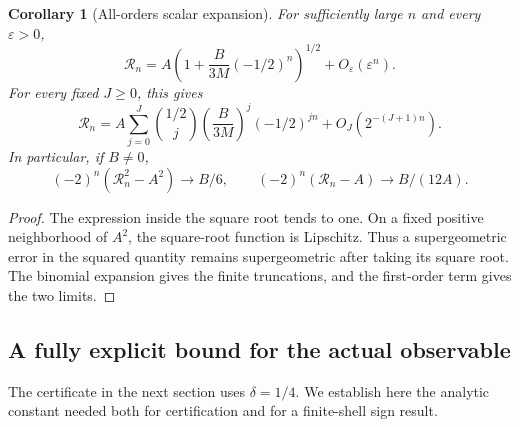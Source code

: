 \documentclass[11pt,a4paper]{article}
\newtheorem{corollary}[theorem]{Corollary}
\theoremstyle{definition}
\theoremstyle{remark}
\numberwithin{equation}{section}
\begin{document}
\begin{corollary}[All-orders scalar expansion]
\label{cor:allorders}
For sufficiently large $n$ and every $\varepsilon>0$,
\begin{equation}
 \mathcal R_n=
 A\left(1+\frac{B}{3M}(-1/2)^n\right)^{1/2}
 +O_\varepsilon(\varepsilon^n).
 \label{eq:allordersroot}
\end{equation}
For every fixed $J\ge0$, this gives
\begin{equation}
 \mathcal R_n=
 A\sum_{j=0}^{J}\binom{1/2}{j}
       \left(\frac{B}{3M}\right)^j(-1/2)^{jn}
 +O_J(2^{-(J+1)n}).
 \label{eq:allordersbinomial}
\end{equation}
In particular, if $B\ne0$,
\begin{equation}
 (-2)^n(\mathcal R_n^2-A^2)\longrightarrow B/6,
 \qquad
 (-2)^n(\mathcal R_n-A)\longrightarrow B/(12A).
 \label{eq:scaledlimits}
\end{equation}
\end{corollary}
\begin{proof}
The expression inside the square root tends to one. On a fixed positive
neighborhood of $A^2$, the square-root function is Lipschitz. Thus a
supergeometric error in the squared quantity remains supergeometric after
taking its square root. The binomial expansion gives the finite truncations,
and the first-order term gives the two limits.
\end{proof}

\subsection{A fully explicit bound for the actual observable}
The certificate in the next section uses $\delta=1/4$. We establish here the
analytic constant needed both for certification and for a finite-shell sign
result.
\end{document}
